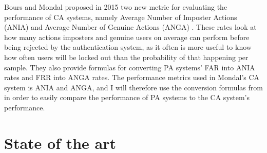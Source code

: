 \documentclass[informationsecurity]{gucmasterproject}
\begin{document}
Bours and Mondal proposed in 2015 two new metric for evaluating the performance of CA systems, namely Average Number of Imposter Actions (ANIA) and Average Number of Genuine Actions (ANGA) \cite{CA-performance}.
These rates look at how many actions imposters and genuine users on average can perform before being rejected by the authentication system, as it often is more useful to know how often users will be locked out than the probability of that happening per sample.
They also provide formulas for converting PA systems' FAR into ANIA rates and FRR into ANGA rates.
The performance metrics used in Mondal's \cite{mondal} CA system is ANIA and ANGA, and I will therefore use the conversion formulas from \cite{CA-performance} in order to easily compare the performance of PA systems to the CA system's performance.




%



\chapter{State of the art}
\label{chap:state}
\end{document}
